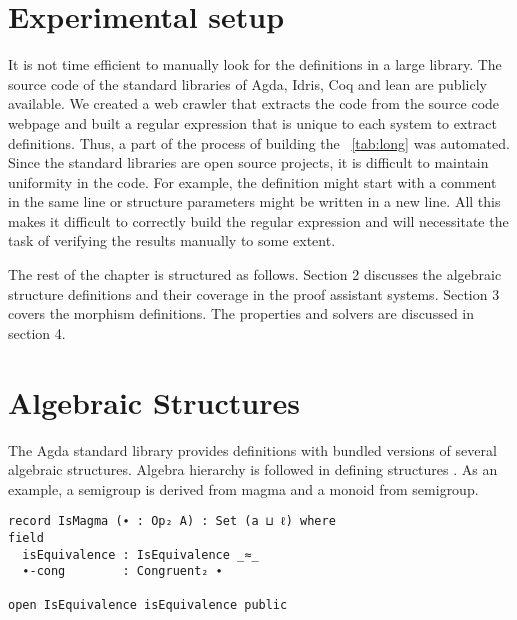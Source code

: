 \section{Experimental setup}
It is not time efficient to manually look for the definitions in a large
library. The source code of the standard libraries of Agda, Idris, Coq and lean
are publicly available. We created a web crawler that extracts the code from the
source code webpage and built a regular expression that is unique to each system
to extract definitions. Thus, a part of the process of building the ~\ref{tab:long} was
automated. Since the standard libraries are open source projects, it is
difficult to maintain uniformity in the code. For example, the definition might
start with a comment in the same line or structure parameters might be written in
a new line. All this makes it difficult to correctly build the regular
expression and will necessitate the task of verifying the results manually to
some extent.   

The rest of the chapter is structured as follows. Section 2 discusses the
algebraic structure definitions and their coverage in the proof assistant
systems. Section 3 covers the morphism definitions. The properties and solvers
are discussed in section 4. 

\section{Algebraic Structures}
The Agda standard library provides definitions with bundled versions of several
algebraic structures. Algebra hierarchy is followed in defining structures
\cite{CaretteBigMath}. As an example, a semigroup is derived from magma and a
monoid from semigroup.

\begin{verbatim}
record IsMagma (∙ : Op₂ A) : Set (a ⊔ ℓ) where
field
  isEquivalence : IsEquivalence _≈_
  ∙-cong        : Congruent₂ ∙

open IsEquivalence isEquivalence public
\end{verbatim}

